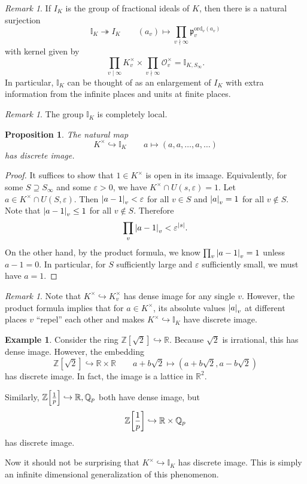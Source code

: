 \documentclass[leqno, openany]{memoir}
\newtheorem{prop}[thm]{Proposition}
\theoremstyle{definition}
\newtheorem{exm}[thm]{Example}
\theoremstyle{remark}
\newtheorem{rmk}[thm]{Remark}
\theoremstyle{plain}
\theoremstyle{definition}
\theoremstyle{remark}
\newcommand{\R}{\mathbb{R}}
\newcommand{\Z}{\mathbb{Z}}
\newcommand{\Q}{\mathbb{Q}}
\newcommand{\I}{\mathbb{I}}
\newcommand{\ep}{\varepsilon}
\newcommand{\mc}[1]{\mathcal{#1}}
\newcommand{\mf}[1]{\mathfrak{#1}}
\newcommand{\mr}[1]{\mathrm{#1}}
\begin{document}
\begin{rmk} If $I_K$ is the group of fractional ideals of $K$, then there is a
    natural surjection \[ \I_K \twoheadrightarrow I_K \qquad (a_v) \mapsto
        \prod_{v \nmid \infty} \mf{p}_v^{\mr{ord}_v(a_v)} \] with kernel given
        by \[ \prod_{v \mid \infty} K_v^{\times} \times \prod_{v \nmid \infty}
        \mc{O}_v^{\times} = \I_{K, S_{\infty}}. \] In particular, $\I_K$ can be
    thought of as an enlargement of $I_K$ with extra information from the
infinite places and units at finite places.  \end{rmk}

\begin{rmk} The group $\I_K$ is completely local.  \end{rmk}

\begin{prop} The natural map \[ K^{\times} \hookrightarrow \I_K \qquad a
\mapsto (a, a, \ldots, a, \ldots) \] has discrete image.  \end{prop}

\begin{proof} It suffices to show that $1 \in K^{\times}$ is open in its
    imaage. Equivalently, for some $S \supseteq S_{\infty}$ and some $\ep > 0$,
    we have $K^{\times} \cap U(s, \ep) = \qty{1}$. Let $a \in K^{\times} \cap
    U(S, \ep)$. Then $\abs{a-1}_v < \ep$ for all $v \in S$ and $\abs{a}_v = 1$
    for all $v \notin S$. Note that $\abs{a-1}_v \leq 1$ for all $v \notin S$.
    Therefore \[ \prod_v \abs{a-1}_v < \ep^{\abs{s}}. \] On the other hand, by
    the product formula, we know $\prod_v \abs{a-1}_v = 1$ unless $a-1 = 0$. In
    particular, for $S$ sufficiently large and $\ep$ sufficiently small, we
    must have $a = 1$.  \end{proof}

\begin{rmk} Note that $K^{\times} \hookrightarrow K_v^{\times}$ has dense image
    for any single $v$. However, the product formula implies that for $a \in
    K^{\times}$, its absolute values $\abs{a}_v$ at different places $v$
    ``repel'' each other and makes $K^{\times} \hookrightarrow \I_K$ have
    discrete image.  \end{rmk}

\begin{exm} Consider the ring $\Z[\sqrt{2}] \hookrightarrow \R$. Because
    $\sqrt{2}$ is irrational, this has dense image. However, the embedding \[
    \Z[\sqrt{2}] \hookrightarrow \R \times \R \qquad a+b\sqrt{2} \mapsto
(a+b\sqrt{2}, a-b\sqrt{2}) \] has discrete image. In fact, the image is a
lattice in $\R^2$.

    Similarly, $\Z\qty[\frac{1}{p}] \hookrightarrow \R, \Q_p$ both have dense
    image, but \[ \Z\qty[\frac{1}{p}] \hookrightarrow \R \times \Q_p \] has
    discrete image.

    Now it should not be surprising that $K^{\times} \hookrightarrow \I_K$ has
discrete image. This is simply an infinite dimensional generalization of this
phenomenon.  \end{exm}
\end{document}
